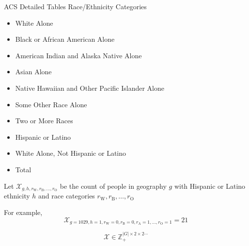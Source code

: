 \documentclass[14pt,aspectratio=169]{beamer}
\newcommand{\var}{\mathcal{X}}
\newcommand{\rc}[1]{r_{\textrm{#1}}}
\begin{document}
\begin{frame}{ACS Detailed Tables Race/Ethnicity Categories}
    \centering
    \begin{itemize}
        \setlength\itemsep{0em}
        \item White Alone
        \item Black or African American Alone
        \item American Indian and Alaska Native Alone
        \item Asian Alone
        \item Native Hawaiian and Other Pacific Islander Alone
        \item Some Other Race Alone
        \item Two or More Races
        \item Hispanic or Latino
        \item White Alone, Not Hispanic or Latino
        \item Total
      \end{itemize}
\end{frame}



\begin{frame}{}
    Let $\var_{g,h,\rc{W},\rc{B},\ldots,\rc{O}}$ be the count of people in geography $g$ with Hispanic or Latino ethnicity $h$ and race categories $\rc{W},\rc{B},\ldots,\rc{O}$

    \bigskip\pause

    For example, $$\var_{g=1029, h=1, \rc{W}=0, \rc{B}=0, \rc{A}=1, \dots, \rc{O}=1} = 21$$

    \bigskip\pause

    $$\var \in \mathbb{Z}_+^{|G| \times 2 \times 2 \cdots}$$
\end{frame}
\end{document}
